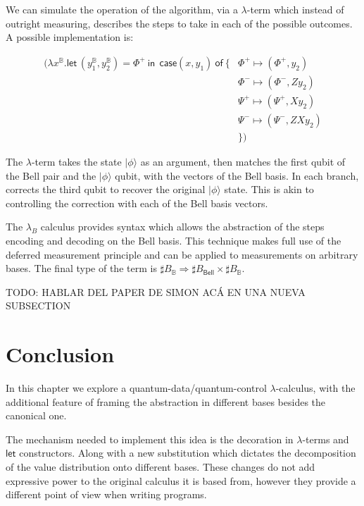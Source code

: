 \documentclass[runningheads,orivec,envcountsame,envcountsect]{llncs}
\newcommand\ket[1]{\ensuremath{|#1\rangle}}
\def\Pair#1#2{(#1,#2)} %
\def\Lam#1#2#3{\lambda#1^{#2}{.}#3} %
\def\letkeyword{\mathsf{let}}
\def\inkeyword{\mathsf{in}}
\def\LetP#1#2#3#4#5#6{\letkeyword\,\Pair{#1^{#2}}{#3^{#4}}=#5~\inkeyword~#6}
\def\Arr{\Rightarrow}
\newcommand\B{\mathbb B}
\newcommand{\Bell}{\mathsf{Bell}}
\newcommand{\lambdaB}{\lambda_B}
\newcommand\basis[1]{\ensuremath{B_{ #1 }}}
\begin{document}
We can simulate the operation of the algorithm, via a $\lambda$-term which instead of outright measuring, describes the steps to take in each of the possible outcomes. A possible implementation is:

\begin{align*}
    (\Lam{x}{\B}{\LetP{y_1}{\B}{y_2}{\B}{\Phi^+}{ ~\mathsf{case } \Pair{x}{y_1}  ~\mathsf{ of }~\{ &\Phi^+\mapsto \Pair{\Phi^+}{y_2}\\
    &\Phi^-\mapsto \Pair{\Phi^-}{Z y_2}\\
    &\Psi^+\mapsto \Pair{\Psi^+}{X y_2}\\
    &\Psi^-\mapsto \Pair{\Psi^-}{ZX y_2}\\
    &\}}})
\end{align*}

The $\lambda$-term takes the state $\ket{\phi}$ as an argument, then matches the first qubit of the Bell pair and the $\ket{\phi}$ qubit, with the vectors of the Bell basis. In each branch, corrects the third qubit to recover the original $\ket{\phi}$ state. This is akin to controlling the correction with each of the Bell basis vectors.

The $\lambdaB$ calculus provides syntax which allows the abstraction of the steps encoding and decoding on the Bell basis. This technique makes full use of the deferred measurement principle and can be applied to measurements on arbitrary bases. The final type of the term is $\sharp\basis{\B}\Arr \sharp\basis{\Bell}\times \sharp\basis{\B}$.

{\color{red} TODO: HABLAR DEL PAPER DE SIMON ACÁ EN UNA NUEVA SUBSECTION}

\section{Conclusion}\label{sec:conclusion}

In this chapter we explore a quantum-data/quantum-control $\lambda$-calculus, with the additional feature of framing the abstraction in different bases besides the canonical one.

The mechanism needed to implement this idea is the decoration in $\lambda$-terms and $\mathsf{let}$ constructors. Along with a new substitution which dictates the decomposition of the value distribution onto different bases. These changes do not add expressive power to the original calculus it is based from, however they provide a different point of view when writing programs. 
\end{document}
